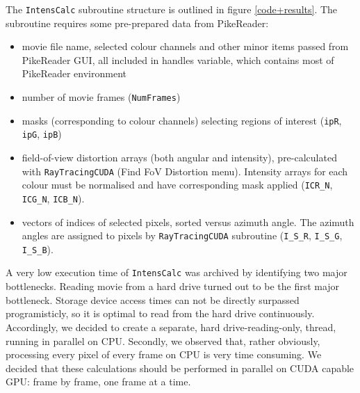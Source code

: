 \documentclass[preprint,review,12pt,dvips]{elsarticle}
\begin{document}
The \texttt{IntensCalc} subroutine structure is outlined in figure \ref{code+results}. The subroutine requires some
pre-prepared data from PikeReader:
\begin{itemize}
\item movie file name, selected colour channels and other minor items passed from PikeReader GUI, all included in handles
variable, which contains most of PikeReader environment

\item number of movie frames (\texttt{NumFrames})

\item masks (corresponding to colour channels) selecting regions of interest (\texttt{ipR}, \texttt{ipG}, \texttt{ipB})

\item field-of-view distortion arrays (both angular and intensity), pre-calculated with \texttt{RayTracingCUDA} (Find FoV
Distortion menu). Intensity arrays for each colour must be normalised and have corresponding mask applied (\verb"ICR_N",
\verb"ICG_N", \verb"ICB_N").

\item vectors of indices of selected pixels, sorted versus azimuth angle. The azimuth angles are assigned to pixels by
\texttt{RayTracingCUDA} subroutine (\verb"I_S_R", \verb"I_S_G", \verb"I_S_B").
\end{itemize}

A very low execution time of \texttt{IntensCalc} was archived by identifying two major bottlenecks. Reading movie from a
hard drive turned out to be the first major bottleneck. Storage device access times can not be directly surpassed
programisticly, so it is optimal to read from the hard drive continuously. Accordingly, we decided to create a separate,
hard drive-reading-only, thread, running in parallel on CPU. Secondly, we observed that, rather obviously, processing
every pixel of every frame on CPU is very time consuming. We decided that these calculations should be performed in
parallel on CUDA capable GPU: frame by frame, one frame at a time.
\end{document}
